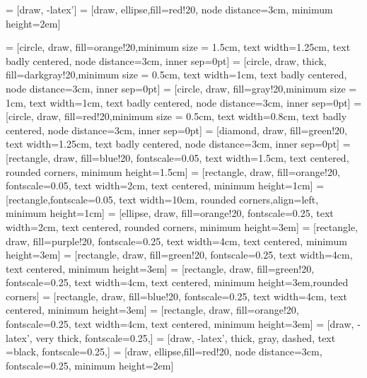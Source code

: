 \usetikzlibrary{shapes.arrows,shapes.geometric,arrows,shadows,automata,positioning,arrows,calc}
\setlength{}  
\setlength\leftmargini{\dimexpr\leftmargini + 0.5em\relax}
\usepackage{relsize}
 = [draw, -latex']
 = [draw, ellipse,fill=red!20, node distance=3cm,
    minimum height=2em]
    \usepackage{pgfplots}
\pgfplotsset{compat=1.3}
\tikzset{>=latex}
 = [circle, draw, fill=orange!20,minimum size = 1.5cm, 
    text width=1.25cm, text badly centered, node distance=3cm, inner sep=0pt]
     = [circle, draw, thick, fill=darkgray!20,minimum size = 0.5cm, 
    text width=1cm, text badly centered, node distance=3cm, inner sep=0pt]
 = [circle, draw, fill=gray!20,minimum size = 1cm, 
    text width=1cm, text badly centered, node distance=3cm, inner sep=0pt]
 = [circle, draw, fill=red!20,minimum size = 0.5cm, 
   text width=0.8cm, text badly centered, node distance=3cm, inner sep=0pt]  
 = [diamond, draw, fill=green!20, 
    text width=1.25cm, text badly centered, node distance=3cm, inner sep=0pt]
 = [rectangle, draw, fill=blue!20, fontscale=0.05,
    text width=1.5cm, text centered, rounded corners, minimum height=1.5cm]
 = [rectangle, draw, fill=orange!20, fontscale=0.05,
    text width=2cm, text centered, minimum height=1cm]
     = [rectangle,fontscale=0.05,
    text width=10cm, rounded corners,align=left, minimum height=1cm]
     = [ellipse, draw, fill=orange!20,  fontscale=0.25,
    text width=2cm, text centered, rounded corners, minimum height=3em]
     = [rectangle, draw, fill=purple!20,  fontscale=0.25,
    text width=4cm, text centered, minimum height=3em]
     = [rectangle, draw, fill=green!20,  fontscale=0.25,
    text width=4cm, text centered, minimum height=3em]
    = [rectangle, draw, fill=green!20,  fontscale=0.25,
    text width=4cm, text centered, minimum height=3em,rounded corners]
     = [rectangle, draw, fill=blue!20,  fontscale=0.25,
    text width=4cm, text centered, minimum height=3em]
     = [rectangle, draw, fill=orange!20,  fontscale=0.25,
    text width=4cm, text centered, minimum height=3em]
 = [draw, -latex', very thick, fontscale=0.25,]
 = [draw, -latex', thick, gray, dashed, text =black, fontscale=0.25,]
 = [draw, ellipse,fill=red!20, node distance=3cm,  fontscale=0.25,
    minimum height=2em]  




